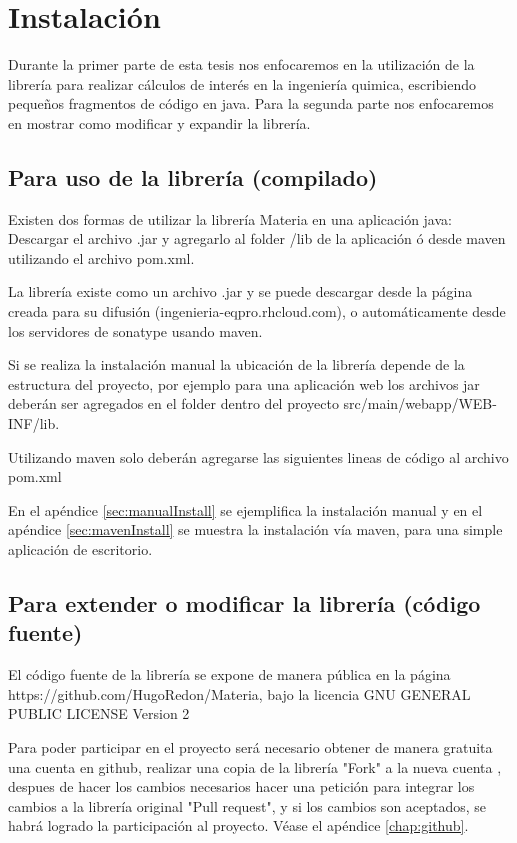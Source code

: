 \chapter{Instalación}

  Durante la primer parte de esta tesis nos enfocaremos en la utilización de la librería para realizar cálculos de interés en la ingeniería quimica, escribiendo pequeños fragmentos de código en java. Para la segunda parte nos enfocaremos en mostrar como modificar y expandir la librería.

  \section{Para uso de la librería (compilado)}

      Existen dos formas de utilizar la librería Materia en una aplicación java:
    Descargar el archivo .jar y agregarlo al folder /lib de la aplicación ó desde maven utilizando el archivo pom.xml.

    La librería existe como un archivo .jar y se puede descargar desde la página creada para su difusión (ingenieria-eqpro.rhcloud.com), o automáticamente desde los servidores de sonatype usando maven.

    Si se realiza la instalación manual la ubicación de la librería depende de la estructura del proyecto, por ejemplo para una aplicación web los archivos jar deberán ser agregados en el folder dentro del proyecto src/main/webapp/WEB-INF/lib.

    Utilizando maven solo deberán agregarse las siguientes lineas de código al archivo pom.xml

    

    En el apéndice \ref{sec:manualInstall} se ejemplifica la instalación manual y en el apéndice \ref{sec:mavenInstall} se muestra la instalación vía maven, para una simple aplicación de escritorio.


  \section{Para extender o modificar la librería (código fuente)}

    El código fuente de la librería se expone de manera pública en la página https://github.com/HugoRedon/Materia, bajo la licencia GNU GENERAL PUBLIC LICENSE Version 2
  
    Para poder participar en el proyecto será necesario obtener de manera gratuita una cuenta en github, realizar una copia de la librería "Fork" a la nueva cuenta , despues de hacer los cambios necesarios hacer una petición para integrar los cambios a la librería original "Pull request", y si los cambios son aceptados, se habrá logrado la participación al proyecto. Véase el apéndice \ref{chap:github}.


